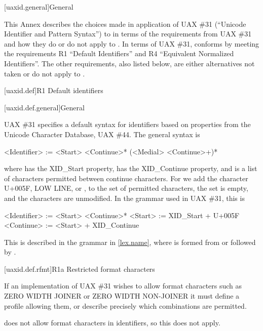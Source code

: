 
[uaxid.general]{General}

\pnum
This Annex describes the choices made in application of
UAX \#31 (``Unicode Identifier and Pattern Syntax'')
to \Cpp{} in terms of the requirements from UAX \#31 and
how they do or do not apply to \Cpp{}.
In terms of UAX \#31,
\Cpp{} conforms by meeting the requirements
R1 ``Default Identifiers'' and
R4 ``Equivalent Normalized Identifiers''.
The other requirements, also listed below,
are either alternatives not taken or do not apply to \Cpp{}.

[uaxid.def]{R1 Default identifiers}

[uaxid.def.general]{General}

\pnum
UAX \#31 specifies a default syntax for identifiers
based on properties from the Unicode Character Database, UAX \#44.
The general syntax is
\begin{codeblock}
<Identifier> := <Start> <Continue>* (<Medial> <Continue>+)*
\end{codeblock}
where  has the XID_Start property,
 has the XID_Continue property, and
 is a list of characters permitted between continue characters.
For \Cpp{} we add the character U+005F, LOW LINE, or \tcode{_},
to the set of permitted  characters,
the  set is empty, and
the  characters are unmodified.
In the grammar used in UAX \#31, this is
\begin{codeblock}
<Identifier> := <Start> <Continue>*
<Start> := XID_Start + U+005F
<Continue> := <Start> + XID_Continue
\end{codeblock}

\pnum
This is described in the \Cpp{} grammar in \ref{lex.name},
where  is formed from
 or
 followed by .

[uaxid.def.rfmt]{R1a Restricted format characters}

\pnum
If an implementation of UAX \#31 wishes to allow format characters
such as ZERO WIDTH JOINER or ZERO WIDTH NON-JOINER
it must define a profile allowing them, or
describe precisely which combinations are permitted.

\pnum
\Cpp{} does not allow format characters in identifiers, so this does not apply.

